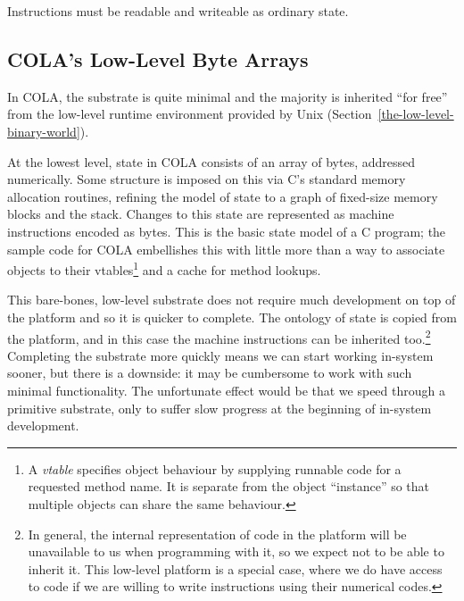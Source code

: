 \documentclass[ twoside,openright,titlepage,numbers=noenddot,headinclude,footinclude,cleardoublepage=empty,abstract=on,
                BCOR=5mm,paper=a4,fontsize=11pt
                ]{scrreprt}
\newcommand{\joel}[1]{}
\theoremstyle{definition}
\begin{document}
\joel{Isn't homoiconicity basically just von Neumann instead of Harvard architecture? any difference?}
\begin{requirement}[Homoiconicity]
Instructions must be readable and writeable as ordinary state.
\end{requirement}

\hypertarget{s-low-level-byte-arrays}{\subsection{\texorpdfstring{\acs{COLA}'s Low-Level Byte
Arrays}{'s Low-Level Byte Arrays}}\label{s-low-level-byte-arrays}}

In \ac{COLA}, the substrate is quite minimal and the majority is
inherited ``for free'' from the low-level runtime environment provided
by Unix (Section~\ref{the-low-level-binary-world}).

At the lowest level, state in \ac{COLA} consists of an array of bytes,
addressed numerically. Some structure is imposed on this via C's
standard memory allocation routines, refining the model of state to a
graph of fixed-size memory blocks and the stack. Changes to this state
are represented as machine instructions encoded as bytes. This is the
basic state model of a C program; the sample code for \ac{COLA}
embellishes this with little more than a way to associate objects to
their vtables\footnote{A \emph{vtable} specifies object behaviour by
  supplying runnable code for a requested method name. It is separate
  from the object ``instance'' so that multiple objects can share the
  same behaviour.} and a cache for method lookups.

This bare-bones, low-level substrate does not require much development
on top of the platform and so it is quicker to complete. The ontology of
state is copied from the platform, and in this case the machine
instructions can be inherited too.\footnote{In general, the internal
  representation of code in the platform will be unavailable to us when
  programming with it, so we expect not to be able to inherit it. This
  low-level platform is a special case, where we do have access to code
  if we are willing to write instructions using their numerical codes.}
Completing the substrate more quickly means we can start working
in-system sooner, but there is a downside: it may be cumbersome to work
with such minimal functionality. The unfortunate effect would be that we
speed through a primitive substrate, only to suffer slow progress at the
beginning of in-system development.
\end{document}
